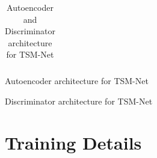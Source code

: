 \documentclass[12pt]{article}
\begin{document}
\begin{appendices}
\begin{table}[ht]
\begin{subtable}{.49\linewidth}
{\begin{tabular}{c}
      \midrule
      \bottomrule
  \end{tabular}
  }
	\caption{Autoencoder architecture for TSM-Net }
  \end{subtable}
  \begin{subtable}{.49\linewidth}
	\caption{Discriminator architecture for TSM-Net }
  \end{subtable}
\caption{Autoencoder and Discriminator architecture for TSM-Net}
\label{tab:arch-a-d}
\end{table}

\section{Training Details}


\end{appendices}
\end{document}
